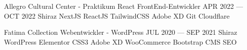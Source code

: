 

\begin{cventries}

\cventry
{Allegro Cultural Center - Praktikum} %
{React FrontEnd-Entwickler} %
{APR 2022 --- OCT 2022} %
{Shiraz} %
{
  NextJS \mitdiv ReactJS \mitdiv TailwindCSS \mitdiv Adobe XD \mitdiv Git \mitdiv Cloudflare
}
% 

\cventry
{Fatima Collection} %
{Webentwickler - WordPress} %
{JUL 2020 --- SEP 2021} %
{Shiraz} %
{
  WordPress \mitdiv Elementor \mitdiv CSS3 \mitdiv Adobe XD \mitdiv WooCommerce \mitdiv Bootstrap \mitdiv CMS \mitdiv SEO
}

\end{cventries}
